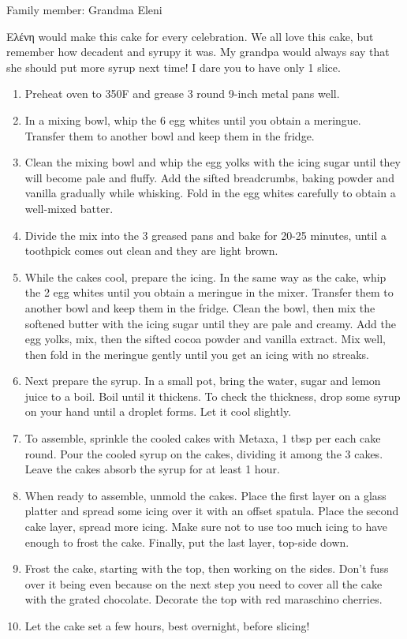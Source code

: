 Family member: Grandma Eleni


 \textgreek{Ελένη} would make this cake for every celebration. We all love this cake, but remember how decadent and syrupy it was. My grandpa would always say that she should put more syrup next time! I dare you to have only 1 slice.

\begin{enumerate}
    \item Preheat oven to 350\degree F and grease 3 round 9-inch metal pans well.
    \item In a mixing bowl, whip the 6 egg whites until you obtain a meringue. Transfer them to another bowl and keep them in the fridge.
    \item Clean the mixing bowl and whip the egg yolks with the icing sugar until they will become pale and fluffy. Add the sifted breadcrumbs, baking powder and vanilla gradually while whisking. Fold in the egg whites carefully to obtain a well-mixed batter.
    \item Divide the mix into the 3 greased pans and bake for 20-25 minutes, until a toothpick comes out clean and they are light brown.
    \item While the cakes cool, prepare the icing. In the same way as the cake, whip the 2 egg whites until you obtain a meringue in the mixer. Transfer them to another bowl and keep them in the fridge. Clean the bowl, then mix the softened butter with the icing sugar until they are pale and creamy. Add the egg yolks, mix, then the sifted cocoa powder and vanilla extract. Mix well, then fold in the meringue gently until you get an icing with no streaks.
    \item Next prepare the syrup. In a small pot, bring the water, sugar and lemon juice to a boil. Boil until it thickens. To check the thickness, drop some syrup on your hand until a droplet forms. Let it cool slightly.
    \item To assemble, sprinkle the cooled cakes with Metaxa, 1 tbsp per each cake round. Pour the cooled syrup on the cakes, dividing it among the 3 cakes. Leave the cakes absorb the syrup for at least 1 hour.
    \item When ready to assemble, unmold the cakes. Place the first layer on a glass platter and spread some icing over it with an offset spatula. Place the second cake layer, spread more icing. Make sure not to use too much icing to have enough to frost the cake. Finally, put the last layer, top-side down.
    \item Frost the cake, starting with the top, then working on the sides. Don't fuss over it being even because on the next step you need to cover all the cake with the grated chocolate. Decorate the top with red maraschino cherries.
    \item Let the cake set a few hours, best overnight, before slicing!
\end{enumerate}
